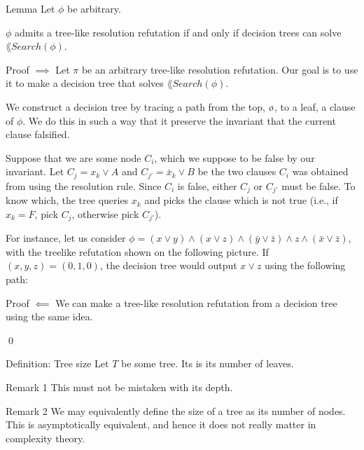 \documentclass[a4paper]{article}
\begin{document}
\begin{parag}{Lemma}
    Let $\phi$ be arbitrary.

    $\phi$ admits a tree-like resolution refutation if and only if decision trees can solve $\lang{Search}\left(\phi\right)$.

    \begin{subparag}{Proof $\implies$}
        Let $\pi$ be an arbitrary tree-like resolution refutation. Our goal is to use it to make a decision tree that solves $\lang{Search}\left(\phi\right)$.

        We construct a decision tree by tracing a path from the top, $\o$, to a leaf, a clause of $\phi$. We do this in such a way that it preserve the invariant that the current clause falsified.

        Suppose that we are some node $C_i$, which we suppose to be false by our invariant. Let $C_j = x_k \lor A$ and $C_{j'} = \bar{x}_k \lor B$ be the two clauses $C_i$ was obtained from using the resolution rule. Since $C_i$ is false, either $C_j$ or $C_{j'}$ must be false. To know which, the tree queries $x_k$ and picks the clause which is not true (i.e., if $x_k = F$, pick $C_j$, otherwise pick $C_{j'}$). 

        For instance, let us consider $\phi = \left(x \lor y\right) \land \left(x \lor z\right) \land \left(\bar{y} \lor \bar{z}\right) \land z \land\left(\bar{x} \lor \bar{z}\right)$, with the treelike refutation shown on the following picture. If $\left(x, y, z\right) = \left(0, 1, 0\right)$, the decision tree would output $x \lor z$ using the following path:
    \end{subparag}

    \begin{subparag}{Proof $\impliedby$}
        We can make a tree-like resolution refutation from a decision tree using the same idea.

        \qed
    \end{subparag}
\end{parag}

\begin{parag}{Definition: Tree size}
    Let $T$ be some tree. Its  is its number of leaves.

    \begin{subparag}{Remark 1}
        This must not be mistaken with its depth.
    \end{subparag}

    \begin{subparag}{Remark 2}
        We may equivalently define the size of a tree as its number of nodes. This is asymptotically equivalent, and hence it does not really matter in complexity theory. 
    \end{subparag}
\end{parag}
\end{document}
